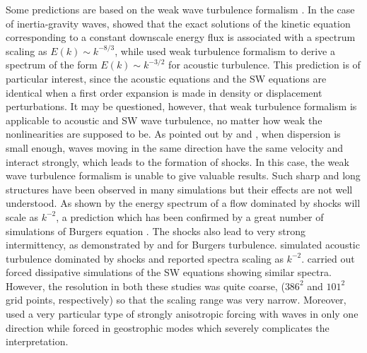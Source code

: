 \documentclass{jfm}
\begin{document}
Some predictions are based on the weak wave turbulence formalism
\cite[]{ZakharovLvovFalkovich1992, Nazarenko2011}. In the case of
inertia-gravity waves, \cite{FalkovichMedvedev1992} showed that the exact
solutions of the kinetic equation corresponding to a constant downscale energy
flux is associated with a spectrum scaling as $E(k) \sim k^{-8/3}$, while
\cite{ZakharovSagdeev1970} used weak turbulence formalism to derive a spectrum
of the form $ E(k) \sim k^{-3/2} $ for acoustic turbulence. This prediction is
of particular interest, since the acoustic equations and the SW equations are
identical when a first order expansion is made in density or displacement
perturbations. It may be questioned, however, that weak turbulence formalism is
applicable to acoustic and SW wave turbulence, no matter how weak the
nonlinearities are supposed to be. As pointed out by \cite{KadomtsevPet1970}
and \cite{FalkovichMeyer1996}, when dispersion is small enough, waves moving in
the same direction have the same velocity and interact strongly, which leads to
the formation of shocks. In this case, the weak wave turbulence formalism is
unable to give valuable results. Such sharp and long structures have been
observed in many simulations \cite[]{FargeSadourny1989,
PolvaniMcWilliamsSpallFord1994, LahayeZeitlin2012} but their effects are not
well understood.
%
As shown by \cite{Burgers1948} the energy spectrum of a flow dominated by
shocks will scale as $ k^{-2} $, a prediction which has been confirmed by a
great number of simulations of Burgers equation \cite[for a review, see ]
[]{Frisch2001}. The shocks also lead to very strong intermittency, as
demonstrated by \cite{BouchaudMezardParisi1995} and
\cite{WeinanKhaninMazelSinai1997} for Burgers turbulence.
%
\cite{FalkovichMeyer1996} simulated acoustic turbulence dominated by shocks
and reported spectra scaling as $ k^{-2} $.
\cite{YuanHamilton1994} carried out
forced dissipative simulations of the SW equations showing similar spectra.
However, the resolution in both these studies was quite coarse, ($386^2$
and $101^2$ grid points, respectively) so that the scaling range was very
narrow.  Moreover, \cite{FalkovichMeyer1996} used a very particular
type of strongly anisotropic forcing with waves in only one
direction while \cite{YuanHamilton1994} forced in geostrophic modes
which severely complicates the interpretation.
\end{document}
